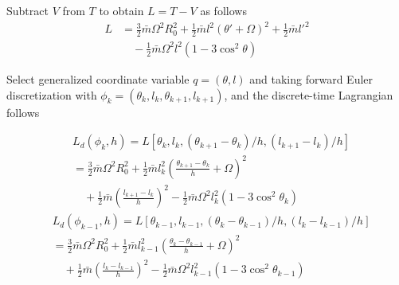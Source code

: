 \documentclass[10pt,final,journal]{IEEEtran}
\newcommand{\NPL}[1]{\newcounter{mytempeqncnt}
\begin{figure}[!t]
\normalsize
\setcounter{mytempeqncnt}{\value{equation}}
\setcounter{equation}{#1}}
\begin{document}
	Subtract $V$ from $T$ to obtain $L=T-V$ as follows 
	\begin{align*}
		L&=\frac{3}{2}\bar m\Omega^2R_0^2+\frac{1}{2}\bar{m}l^2(\theta'+\Omega)^2+\frac{1}{2}\bar{m}l'^2\\
		&\quad-\frac{1}{2}\bar{m}\Omega^2l^2(1-3\cos^2\theta)
	\end{align*}

	Select generalized coordinate variable $q=(\theta,l)$ and taking forward Euler discretization with $\phi_k=(\theta_k,l_k,\theta_{k+1},l_{k+1})$, and the discrete-time Lagrangian follows

  \begin{align*}
	&L_d(\phi_k,h)=L\left[\theta_k,l_k,(\theta_{k+1}-\theta_{k})/h,(l_{k+1}-l_{k})/h\right]\\
		&=\frac{3}{2}\bar m\Omega^2R_0^2+\frac{1}{2}\bar{m}l_k^2\left(\frac{\theta_{k+1}-\theta_k}{h}+\Omega\right)^2\\
		&\quad+\frac{1}{2}\bar{m}\left(\frac{l_{k+1}-l_k}{h}\right)^2-\frac{1}{2}\bar{m}\Omega^2l_k^2(1-3\cos^2\theta_k)
	\end{align*}\begin{align*}
			&L_d(\phi_{k-1},h)=L\left[\theta_{k-1},l_{k-1},(\theta_{k}-\theta_{k-1})/h,(l_{k}-l_{k-1})/h\right]\\
		&=\frac{3}{2}\bar m\Omega^2R_0^2+\frac{1}{2}\bar{m}l_{k-1}^2\left(\frac{\theta_{k}-\theta_{k-1}}{h}+\Omega\right)^2\\
		&\quad+\frac{1}{2}\bar{m}\left(\frac{l_{k}-l_{k-1}}{h}\right)^2-\frac{1}{2}\bar{m}\Omega^2l_{k-1}^2(1-3\cos^2\theta_{k-1})
  \end{align*}
 
\end{document}
